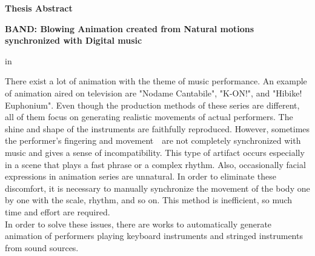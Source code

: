\begin{center}
{\bf {\large Thesis Abstract}}

\vspace{2ex}

{\bf {\large BAND: Blowing Animation created from Natural motions synchronized with Digital music}}
\end{center}

\vspace{3ex}

 in

There exist a lot of animation with the theme of music performance.
%
An example of animation aired on television are "Nodame Cantabile", "K-ON!", and "Hibike! Euphonium".
%
Even though the production methods of these series are different, all of them focus on generating realistic movements of actual performers.
%
The shine and shape of the instruments are faithfully reproduced.
%
However, sometimes the performer's fingering and movement　are not completely synchronized with music and gives a sense of incompatibility.
%
This type of artifact occurs especially in a scene that plays a fast phrase or a complex rhythm.
%
Also, occasionally facial expressions in animation series are unnatural.
%
In order to eliminate these discomfort, 
it is necessary to manually synchronize the movement of the body one by one with the scale, rhythm, and so on.
%
This method is inefficient, so much time and effort are required.\\
\indent
%
In order to solve these issues, there are works to automatically generate animation of performers playing keyboard instruments and stringed instruments from sound sources.
